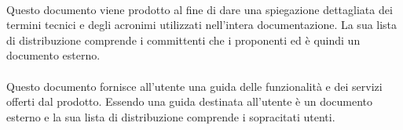 \paragraph{\glossario}
Questo documento viene prodotto al fine di dare una spiegazione dettagliata dei termini tecnici e degli acronimi utilizzati nell'intera documentazione. La sua lista di distribuzione comprende i committenti che i proponenti ed è quindi un documento esterno.

\paragraph{\MU}
Questo documento fornisce all'utente una guida delle funzionalità e dei servizi offerti dal prodotto. Essendo una guida destinata all'utente è un documento esterno e la sua lista di distribuzione comprende i sopracitati utenti.

